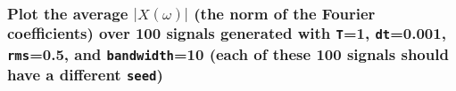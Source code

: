 \documentclass{article}
\begin{document}
    \begin{center}
    \end{center}
    { \hspace*{\fill} \\}
    
\subsubsection{Plot the average $|X(\omega)|$ (the norm of the Fourier
coefficients) over 100 signals generated with \texttt{T}=1,
\texttt{dt}=0.001, \texttt{rms}=0.5, and \texttt{bandwidth}=10 (each of
these 100 signals should have a different
\texttt{seed})}\label{b-plot-the-average-xomega-the-norm-of-the-fourier-coefficients-over-100-signals-generated-with-t1-dt0.001-rms0.5-and-bandwidth10-each-of-these-100-signals-should-have-a-different-seed}
\end{document}
